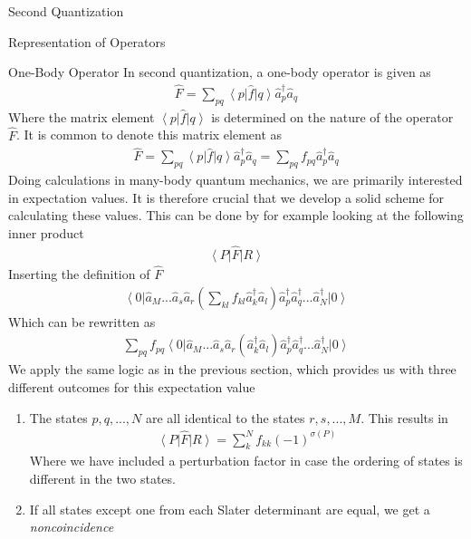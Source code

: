 \documentclass[twoside,english]{uiofysmaster}
\begin{document}
\begin{chapter}{Second Quantization}
\begin{section}{Representation of Operators}
		\begin{subsection}{One-Body Operator}
			In second quantization, a one-body operator is given as
			\begin{align}
				\hat F = \sum_{pq} \left< p \right| \hat f \left| q \right> \hat a_p^\dagger \hat a_q 
			\end{align}
			Where the matrix element $\left< p \right| \hat f \left| q \right>$ is determined on the nature of the operator $\hat F$. It is common to denote this matrix element as
			\begin{align}
				\hat F = \sum_{pq} \left< p \right| \hat f \left| q \right> \hat a_p^\dagger \hat a_q = \sum_{pq} f_{pq} \hat a_p^\dagger \hat a_q
			\end{align}
			Doing calculations in many-body quantum mechanics, we are primarily interested in expectation values. It is therefore crucial that we develop a solid scheme for calculating these values. This can be done by for example looking at the following inner product 
			\begin{align}
				\left< P \right| \hat F \left| R \right> 
			\end{align}
			Inserting the definition of $\hat F$
			\begin{align}
				\left< 0 \right| \hat a_M ... \hat a_s \hat a_r \left( \sum_{kl} f_{kl} \hat a_k^\dagger \hat a_l \right) \hat a_p^\dagger \hat a_q^\dagger ... \hat a_N^\dagger \left| 0 \right>
			\end{align}
			Which can be rewritten as
			\begin{align}
				\sum_{pq} f_{pq} \left< 0 \right| \hat a_M ... \hat a_s \hat a_r (\hat a_k^\dagger \hat a_l) \hat a_p^\dagger \hat a_q^\dagger ... \hat a_N^\dagger \left| 0 \right>
			\end{align}
			We apply the same logic as in the previous section, which provides us with three different outcomes for this expectation value
			\begin{enumerate}
				\item The states $p,q,...,N$ are all identical to the states $r,s,...,M$. This results in
				\begin{align}
					\left< P \right| \hat F \left| R \right> = \sum_k^N f_{kk} (-1)^{\sigma(P)}
				\end{align}
				Where we have included a perturbation factor in case the ordering of states is different in the two states. 
				\item If all states except one from each Slater determinant are equal, we get a \textit{noncoincidence} \cite{ShavittAndBartlett}

\end{enumerate}
\end{subsection}
\end{section}
\end{chapter}
\end{document}
